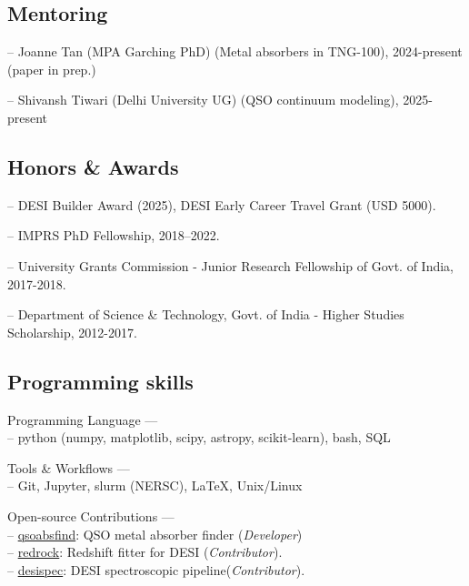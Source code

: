 \documentclass[12pt,letterpaper]{article}
\begin{document}
\subsection{Mentoring}
  \vspace{-1mm}
\begin{list}{}{\cvlist}
\item -- Joanne Tan (MPA Garching PhD) (Metal absorbers in TNG-100), 2024-present (paper in prep.)
\item -- Shivansh Tiwari (Delhi University UG) (QSO continuum modeling), 2025-present
\end{list}
  \vspace{-2mm}
\subsection{Honors \& Awards}

\begin{list}{}{\cvlist}
  \item -- DESI Builder Award (2025), DESI Early Career Travel Grant (USD 5000).
  \item -- IMPRS PhD Fellowship, 2018--2022.
  \item -- University Grants Commission - Junior Research Fellowship of Govt. of India, 2017-2018.
  \item -- Department of Science \& Technology, Govt. of India -  Higher Studies Scholarship, 2012-2017.
\end{list}

\subsection{Programming skills}
\begin{list}{}{\cvlist}
\item Programming Language ---\\
   -- python (numpy, matplotlib, scipy, astropy, scikit-learn), bash, SQL
  \item Tools \& Workflows ---\\
  -- Git, Jupyter, slurm (NERSC), LaTeX, Unix/Linux  
\item Open-source Contributions ---\\
   -- \href{https://github.com/abhi0395/qsoabsfind}{qsoabsfind}: QSO metal absorber finder (\textit{Developer})\\
   -- \href{https://github.com/desihub/redrock}{redrock}: Redshift fitter for DESI (\textit{Contributor}).\\
   -- \href{https://github.com/desihub/desispec}{desispec}: DESI spectroscopic pipeline(\textit{Contributor}).
\end{list}
\end{document}
